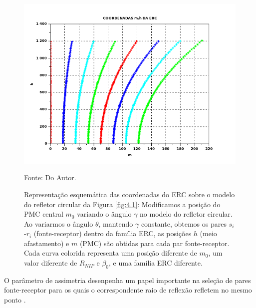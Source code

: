 \begin{figure}[htb]
\caption{Representação esquemática das coordenadas do ERC sobre o modelo do refletor circular da Figura \ref{fig:4.1}:
Modificamos a posição do PMC central $m_0$ variando o ângulo $\gamma$ no modelo do refletor circular.
Ao variarmos o ângulo $\theta$, mantendo $\gamma$ constante, obtemos os pares $s_i$-$r_i$ (fonte-receptor)
dentro da família
ERC, as posições $h$ (meio afastamento) e $m$ (PMC) são obtidas para cada par fonte-receptor.
Cada curva colorida representa uma posição
diferente de $m_0$, um valor diferente de $R_{NIP}$ e $\beta_0$, e uma família ERC diferente.}
\begin{center}
\includegraphics[scale=0.5]{images/coordenadas_CRE.png}
\vspace{-0.3cm}
\end{center}
\begin{center}
 Fonte: Do Autor.
\end{center}
\label{fig:4.2}
\end{figure}





O parâmetro de assimetria desenpenha um papel importante na seleção de pares fonte-receptor para os quais
o correspondente raio de reflexão refletem no mesmo ponto \cite{tygel}.




